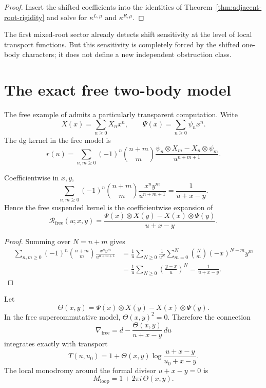 \begin{proof}
Insert the shifted coefficients into the identities of
Theorem~\ref{thm:adjacent-root-rigidity} and solve for
$\kappa^{L,\mu}$ and $\kappa^{R,\mu}$.
\end{proof}

\begin{interpretation}
The first mixed-root sector already detects shift sensitivity at the
level of local transport functions.  But this sensitivity is completely
forced by the shifted one-body characters; it does not define a new
independent obstruction class.
\end{interpretation}

\section{The exact free two-body model}

The free example of \cite{DNP25} admits a particularly transparent
computation.  Write
\[
X(x)=\sum_{n\ge 0} X_n x^n,
\qquad
\Psi(x)=\sum_{n\ge 0} \psi_n x^n.
\]
The dg kernel in the free model is
\[
r(u)=\sum_{n,m\ge 0}(-1)^n\binom{n+m}{m}
\frac{\psi_n\otimes X_m-X_n\otimes \psi_m}{u^{n+m+1}}.
\]

\begin{lemma}
\ClaimStatusProvedHere
\label{lem:free-closed-generating-kernel}
Coefficientwise in $x,y$,
\[
\sum_{n,m\ge 0}(-1)^n\binom{n+m}{m}\frac{x^n y^m}{u^{n+m+1}}
=
\frac{1}{u+x-y}.
\]
Hence the free suspended kernel is the coefficientwise expansion of
\[
\mathcal R_{\mathrm{free}}(u;x,y)=
\frac{\Psi(x)\otimes X(y)-X(x)\otimes \Psi(y)}{u+x-y}.
\]
\end{lemma}

\begin{proof}
Summing over $N=n+m$ gives
\begin{align*}
\sum_{n,m\ge 0}(-1)^n\binom{n+m}{m}\frac{x^n y^m}{u^{n+m+1}}
&=
\frac1u\sum_{N\ge 0}\frac1{u^N}
\sum_{m=0}^N \binom{N}{m}(-x)^{N-m}y^m\\
&=
\frac1u\sum_{N\ge 0}\left(\frac{y-x}{u}\right)^N
=
\frac{1}{u+x-y}.
\end{align*}
\end{proof}

\begin{theorem}
\ClaimStatusProvedHere
\label{thm:exact-free-transport}
Let
\[
\Theta(x,y)=\Psi(x)\otimes X(y)-X(x)\otimes \Psi(y).
\]
In the free supercommutative model, $\Theta(x,y)^2=0$.  Therefore the
connection
\[
\nabla_{\mathrm{free}}=d-
\frac{\Theta(x,y)}{u+x-y}\,du
\]
integrates exactly with transport
\[
T(u,u_0)=1+\Theta(x,y)\log\!\frac{u+x-y}{u_0+x-y}.
\]
The local monodromy around the formal divisor $u+x-y=0$ is
\[
M_{\mathrm{loop}}=1+2\pi i\,\Theta(x,y).
\]
\end{theorem}

